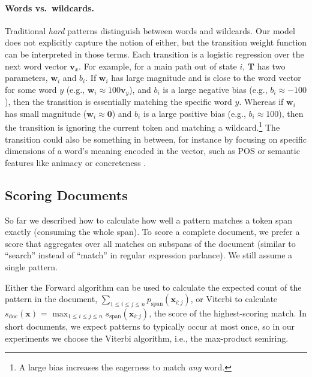 \documentclass[11pt,a4paper]{article}
\renewcommand{\cite}[1]{\citep{#1}}
\newcommand{\isubsection}[2]{\subsection{#1}\label{ssec:#2}}
\newcommand{\softp}{pattern\xspace}
\newcommand{\happy}{main path\xspace}
\newcommand{\tensor}[1]{\mathbf{#1}}
\newcommand{\seq}[1]{\bm{#1}}
\newcommand{\camready}[1]{#1}
\begin{document}
\paragraph{Words vs.~wildcards.}
Traditional  {\it hard} patterns distinguish between words and wildcards. 
Our model does not explicitly capture the notion of either, but the
transition weight function can be interpreted in those terms.
Each transition is a logistic regression over the next word vector $\tensor{v}_x$.
For example, for a \happy out of state $i$, $\tensor{T}$ has two parameters, $\tensor{w}_{i}$ and $b_{i}$.
If $\tensor{w}_{i}$ has large magnitude and is close to the word vector for some word $y$ (e.g., $\tensor{w}_i \approx 100 \tensor{v}_y$), and $b_i$ is a large negative bias (e.g., $b_i \approx -100$), then the transition is essentially matching the specific word $y$.
Whereas if $\tensor{w}_i$ has small magnitude ($\tensor{w}_i \approx
\tensor{0}$) and $b_i$ is a large positive bias (e.g., $b_i \approx
100$), then the transition is ignoring the current token and matching
 a wildcard.\footnote{A large bias increases the
eagerness to match \emph{any} word.}
The transition could also be something in between, for instance by
focusing on specific dimensions of a word's meaning encoded in the
vector, such as POS or semantic features like animacy or
concreteness \cite{\camready{Rubinstein:2015,}Tsvetkov:2015}. 



\isubsection{Scoring Documents}{soft-patterns:encoding}


So far we described how to calculate how well a pattern matches a token span exactly (consuming the whole span).
To score a complete document, we prefer a score that aggregates over all matches on subspans of the document (similar to ``search'' instead of ``match'' in regular expression parlance).
We still assume a single \softp.

Either the Forward algorithm can be used to calculate  the expected
count of the pattern in the document,
$\sum_{1\leq i \leq j \leq
  n}{p_{\text{span}}(\seq{x}_{i:j})}$, or Viterbi to calculate
$s_{\text{doc}}(\seq{x})$ = $\max_{1\leq i \leq j \leq
  n}{s_{\text{span}}(\seq{x}_{i:j})}$, the score of
  the highest-scoring match.
In short documents, we expect patterns to typically occur at most once, 
so in our experiments we choose the Viterbi algorithm, i.e., the max-product semiring.
\end{document}
